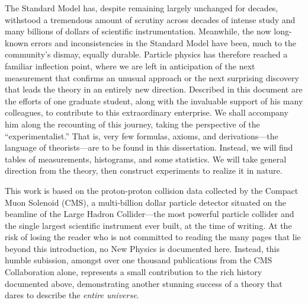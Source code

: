 \begin{dissertationintroduction}
The Standard Model has, despite remaining largely unchanged for decades, withstood a tremendous amount of scrutiny across decades of intense study and many billions of dollars of scientific instrumentation. %
Meanwhile, the now long-known errors and inconsistencies in the Standard Model have been, much to the community's dismay, equally durable. %
Particle physics has therefore reached a familiar inflection point, where we are left in anticipation of the next measurement that confirms an unusual approach or the next surprising discovery that leads the theory in an entirely new direction. 
Described in this document are the efforts of one graduate student, along with the invaluable support of his many colleagues, to contribute to this extraordinary enterprise. 
We shall accompany him along the recounting of this journey, taking the perspective of the ``experimentalist.'' 
That is, very few formulas, axioms, and derivations---the language of theorists---are to be found in this dissertation. 
Instead, we will find tables of measurements, histograms, and some statistics. 
We will take general direction from the theory, then construct experiments to realize it in nature. 

This work is based on the proton-proton collision data collected by the Compact Muon Solenoid (CMS), a multi-billion dollar particle detector situated on the beamline of the Large Hadron Collider---the most powerful particle collider and the single largest scientific instrument ever built, at the time of writing. 
At the risk of losing the reader who is not committed to reading the many pages that lie beyond this introduction, no New Physics is documented here.
Instead, this humble subission, amongst over one thousand publications from the CMS Collaboration alone, represents a small contribution to the rich history documented above, demonstrating another stunning success of a theory that dares to describe the \textit{entire universe}.
\end{dissertationintroduction}
